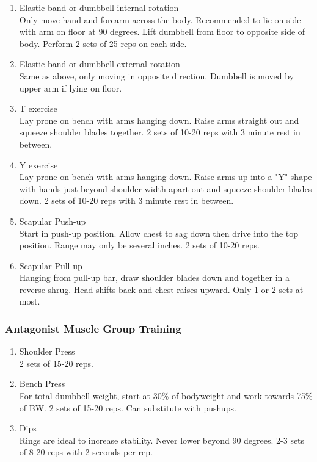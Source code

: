 \documentclass[12pt, letterpaper]{article}
\begin{document}
\begin{enumerate}
    \item Elastic band or dumbbell internal rotation \\ 
          Only move hand and forearm across the body. Recommended to lie on side with arm on floor 
          at 90 degrees. Lift dumbbell from floor to opposite side of body. 
          Perform 2 sets of 25 reps on each side.
    \item Elastic band or dumbbell external rotation \\ 
          Same as above, only moving in opposite direction. Dumbbell is moved by upper arm if 
          lying on floor.
    \item T exercise \\ 
          Lay prone on bench with arms hanging down. Raise arms straight out and squeeze 
          shoulder blades together. 2 sets of 10-20 reps with 3 minute rest in between.
    \item Y exercise \\ 
          Lay prone on bench with arms hanging down. Raise arms up into a "Y" shape with 
          hands just beyond shoulder width apart out and squeeze shoulder blades down. 
          2 sets of 10-20 reps with 3 minute rest in between.
    \item Scapular Push-up \\ 
          Start in push-up position. Allow chest to sag down then drive into the top position. 
          Range may only be several inches. 2 sets of 10-20 reps.
    \item Scapular Pull-up \\ 
          Hanging from pull-up bar, draw shoulder blades down and together in a reverse shrug. 
          Head shifts back and chest raises upward. Only 1 or 2 sets at most.
\end{enumerate}

\subsubsection{Antagonist Muscle Group Training}

\begin{enumerate}
    \item Shoulder Press \\ 
          2 sets of 15-20 reps.
    \item Bench Press \\ 
          For total dumbbell weight, start at 30\% of bodyweight and work towards 75\% of BW. 2 sets of 15-20 reps. 
          Can substitute with pushups.
    \item Dips \\ 
          Rings are ideal to increase stability. Never lower beyond 90 degrees. 2-3 sets of 8-20 reps with 2 seconds per rep.
\end{enumerate}
\end{document}
